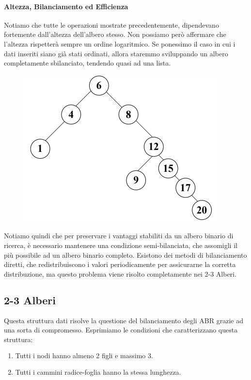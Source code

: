 \documentclass{article}
\begin{document}
\paragraph{Altezza, Bilanciamento ed Efficienza} Notiamo che tutte le operazioni mostrate precedentemente, dipendevano fortemente dall'altezza dell'albero stesso. Non possiamo però affermare che l'altezza rispetterà sempre un ordine logaritmico. Se ponessimo il caso in cui i dati inseriti siano già stati ordinati, allora staremmo sviluppando un albero completamente sbilanciato, tendendo quasi ad una lista.

\begin{figure}[htbp]
        \center
        \includegraphics[scale=0.6]{img/bilanciamentoABR.png}
    \end{figure}

Notiamo quindi che per preservare i vantaggi stabiliti da un albero binario di ricerca, è necessario mantenere una condizione semi-bilanciata, che assomigli il più possibile ad un albero binario completo. Esistono dei metodi di bilanciamento diretti, che redistribuiscono i valori periodicamente per assicurarne la corretta distribuzione, ma questo problema viene risolto completamente nei 2-3 Alberi.

\newpage

\subsection{2-3 Alberi} Questa struttura dati risolve la questione del bilanciamento degli ABR grazie ad una sorta di compromesso. Esprimiamo le condizioni che caratterizzano questa struttura:

\begin{enumerate}
    \item Tutti i nodi hanno almeno 2 figli e massimo 3.
    \item Tutti i cammini radice-foglia hanno la stessa lunghezza.
\end{enumerate}
\end{document}
